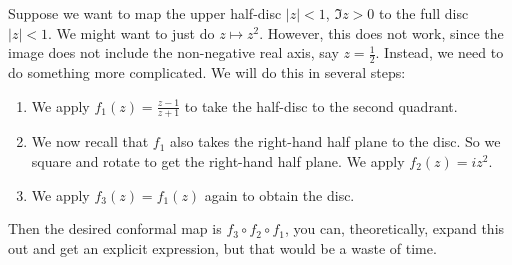 \documentclass[a4paper]{article}
\begin{document}
\begin{eg}
  Suppose we want to map the upper half-disc $|z| < 1$, $\Im z > 0$ to the full disc $|z| < 1$. We might want to just do $z \mapsto z^2$. However, this does not work, since the image does not include the non-negative real axis, say $z = \frac{1}{2}$. Instead, we need to do something more complicated. We will do this in several steps:
  \begin{enumerate}
    \item We apply $f_1(z) = \frac{z - 1}{z + 1}$ to take the half-disc to the second quadrant.
    \item We now recall that $f_1$ also takes the right-hand half plane to the disc. So we square and rotate to get the right-hand half plane. We apply $f_2(z) = iz^2$.
    \item We apply $f_3(z) = f_1(z)$ again to obtain the disc.
  \end{enumerate}
  Then the desired conformal map is $f_3 \circ f_2 \circ f_1$, you can, theoretically, expand this out and get an explicit expression, but that would be a waste of time.
  \begin{center}
  \end{center}
\end{eg}
\end{document}
